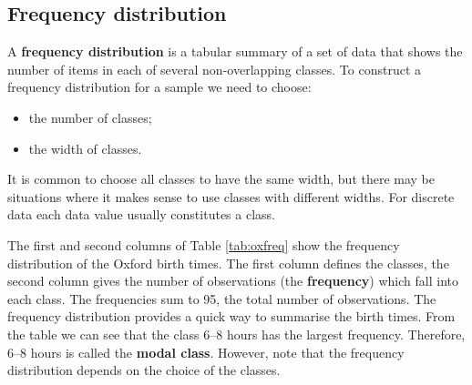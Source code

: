 \documentclass[
  11pt,
  british,
  openany, a4paper]{book}
\providecommand{\tightlist}{%
  \setlength{\itemsep}{0pt}\setlength{\parskip}{0pt}}
\begin{document}
\hypertarget{frequency-distribution}{%
\subsection{Frequency distribution}\label{frequency-distribution}}

A \textbf{frequency distribution} is a tabular summary of a set of data that shows the number of items in each of several non-overlapping classes. To construct a frequency distribution for a sample we need to choose:

\begin{itemize}
\tightlist
\item
  the number of classes;
\item
  the width of classes.
\end{itemize}

It is common to choose all classes to have the same width, but there may be situations where it makes sense to use classes with different widths. For
discrete data each data value usually constitutes a class.

The first and second columns of Table \ref{tab:oxfreq} show the frequency distribution of the Oxford birth times. The first column defines the classes, the second column gives the number of observations (the \textbf{frequency}) which fall into each class. The frequencies sum to 95, the total number of observations. The frequency distribution provides a quick way to summarise the birth times. From the table we can see that the class 6--8 hours has the largest frequency. Therefore, 6--8 hours is called the \textbf{modal class}. However, note that the frequency distribution depends on the choice of the classes.



 
  \providecommand{\huxb}[2]{\arrayrulecolor[RGB]{#1}\global\arrayrulewidth=#2pt}
  \providecommand{\huxvb}[2]{\color[RGB]{#1}\vrule width #2pt}
  \providecommand{\huxtpad}[1]{\rule{0pt}{#1}}
  \providecommand{\huxbpad}[1]{\rule[-#1]{0pt}{#1}}
\end{document}
